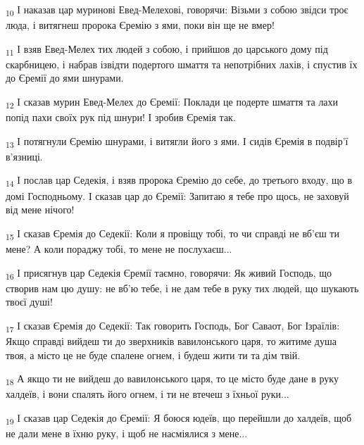 \begin{tcolorbox}
\textsubscript{10} І наказав цар муринові Евед-Мелехові, говорячи: Візьми з собою звідси троє люда, і витягнеш пророка Єремію з ями, поки він ще не вмер!
\end{tcolorbox}
\begin{tcolorbox}
\textsubscript{11} І взяв Евед-Мелех тих людей з собою, і прийшов до царського дому під скарбницею, і набрав ізвідти подертого шмаття та непотрібних лахів, і спустив їх до Єремії до ями шнурами.
\end{tcolorbox}
\begin{tcolorbox}
\textsubscript{12} І сказав мурин Евед-Мелех до Єремії: Поклади це подерте шмаття та лахи попід пахи своїх рук під шнури! І зробив Єремія так.
\end{tcolorbox}
\begin{tcolorbox}
\textsubscript{13} І потягнули Єремію шнурами, і витягли його з ями. І сидів Єремія в подвір'ї в'язниці.
\end{tcolorbox}
\begin{tcolorbox}
\textsubscript{14} І послав цар Седекія, і взяв пророка Єремію до себе, до третього входу, що в домі Господньому. І сказав цар до Єремії: Запитаю я тебе про щось, не заховуй від мене нічого!
\end{tcolorbox}
\begin{tcolorbox}
\textsubscript{15} І сказав Єремія до Седекії: Коли я провіщу тобі, то чи справді не вб'єш ти мене? А коли пораджу тобі, то мене не послухаєш...
\end{tcolorbox}
\begin{tcolorbox}
\textsubscript{16} І присягнув цар Седекія Єремії таємно, говорячи: Як живий Господь, що створив нам цю душу: не вб'ю тебе, і не дам тебе в руку тих людей, що шукають твоєї душі!
\end{tcolorbox}
\begin{tcolorbox}
\textsubscript{17} І сказав Єремія до Седекії: Так говорить Господь, Бог Саваот, Бог Ізраїлів: Якщо справді вийдеш ти до зверхників вавилонського царя, то житиме душа твоя, а місто це не буде спалене огнем, і будеш жити ти та дім твій.
\end{tcolorbox}
\begin{tcolorbox}
\textsubscript{18} А якщо ти не вийдеш до вавилонського царя, то це місто буде дане в руку халдеїв, і вони спалять його огнем, і ти не втечеш з їхньої руки...
\end{tcolorbox}
\begin{tcolorbox}
\textsubscript{19} І сказав цар Седекія до Єремії: Я боюся юдеїв, що перейшли до халдеїв, щоб не дали мене в їхню руку, і щоб не насміялися з мене...
\end{tcolorbox}
